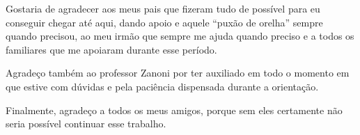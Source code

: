 Gostaria de agradecer aos meus pais que fizeram tudo de possível para
eu conseguir chegar até aqui, dando apoio e aquele ``puxão de orelha''
sempre quando precisou, ao meu irmão que sempre me ajuda quando
preciso e a todos os familiares que me apoiaram durante esse período.

Agradeço também ao professor Zanoni por ter auxiliado em todo o
momento em que estive com dúvidas e pela paciência dispensada durante
a orientação.

Finalmente, agradeço a todos os meus amigos, porque sem eles
certamente não seria possível continuar esse trabalho.

